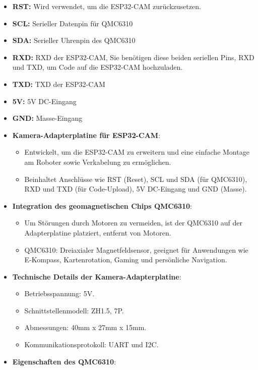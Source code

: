 \documentclass{vorlage-design-main}
\begin{document}
\begin{itemize}
\item
  \textbf{RST:} Wird verwendet, um die ESP32-CAM zurückzusetzen.
\item
  \textbf{SCL:} Serieller Datenpin für QMC6310
\item
  \textbf{SDA:} Serieller Uhrenpin des QMC6310
\item
  \textbf{RXD:} RXD der ESP32-CAM, Sie benötigen diese beiden seriellen
  Pins, RXD und TXD, um Code auf die ESP32-CAM hochzuladen.
\item
  \textbf{TXD:} TXD der ESP32-CAM
\item
  \textbf{5V:} 5V DC-Eingang
\item
  \textbf{GND:} Masse-Eingang
\item
  \textbf{Kamera-Adapterplatine für ESP32-CAM}:

  \begin{itemize}
  
  \item
    Entwickelt, um die ESP32-CAM zu erweitern und eine einfache Montage
    am Roboter sowie Verkabelung zu ermöglichen.
  \item
    Beinhaltet Anschlüsse wie RST (Reset), SCL und SDA (für QMC6310),
    RXD und TXD (für Code-Upload), 5V DC-Eingang und GND (Masse).
  \end{itemize}
\item
  \textbf{Integration des geomagnetischen Chips QMC6310}:

  \begin{itemize}
  
  \item
    Um Störungen durch Motoren zu vermeiden, ist der QMC6310 auf der
    Adapterplatine platziert, entfernt von Motoren.
  \item
    QMC6310: Dreiaxialer Magnetfeldsensor, geeignet für Anwendungen wie
    E-Kompass, Kartenrotation, Gaming und persönliche Navigation.
  \end{itemize}
\item
  \textbf{Technische Details der Kamera-Adapterplatine}:

  \begin{itemize}
  
  \item
    Betriebsspannung: 5V.
  \item
    Schnittstellenmodell: ZH1.5, 7P.
  \item
    Abmessungen: 40mm x 27mm x 15mm.
  \item
    Kommunikationsprotokoll: UART und I2C.
  \end{itemize}
\item
  \textbf{Eigenschaften des QMC6310}:


\end{itemize}
\end{document}
